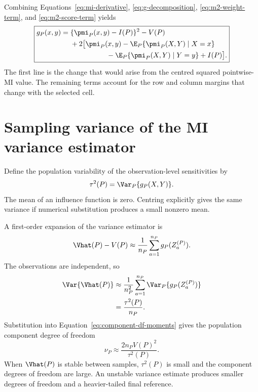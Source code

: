 Combining Equations~\eqref{eq:mi-derivative},
\eqref{eq:g-decomposition}, \eqref{eq:m2-weight-term}, and
\eqref{eq:m2-score-term} yields
\begin{equation}
\boxed{
\begin{aligned}
g_P(x,y)
={}&\{\pmi_P(x,y)-I(P)\}^2-V(P)\\
&+2\bigl[
\pmi_P(x,y)
-\E_P\{\pmi_P(X,Y)\mid X=x\}\\
&\hspace{18mm}
-\E_P\{\pmi_P(X,Y)\mid Y=y\}
+I(P)
\bigr].
\end{aligned}
}
\label{eq:g-final}
\end{equation}
The first line is the change that would arise from the centred squared
pointwise-MI value. The remaining terms account for the row and column margins
that change with the selected cell.

\section{Sampling variance of the MI variance estimator}

Define the population variability of the observation-level sensitivities by
\begin{equation}
  \tau^2(P)=\Var_P\{g_P(X,Y)\}.
  \label{eq:tau-definition}
\end{equation}
The mean of an influence function is zero. Centring explicitly gives the same
variance if numerical substitution produces a small nonzero mean.

A first-order expansion of the variance estimator is
\begin{equation}
  \Vhat(P)-V(P)
  \approx
  \frac{1}{n_P}
  \sum_{a=1}^{n_P}g_P(Z_a^{(P)}).
  \label{eq:vhat-linearization}
\end{equation}
The observations are independent, so
\begin{align}
  \Var\{\Vhat(P)\}
  &\approx
  \frac{1}{n_P^2}
  \sum_{a=1}^{n_P}
  \Var_P\{g_P(Z_a^{(P)})\}\\
  &=\frac{\tau^2(P)}{n_P}.
  \label{eq:vhat-sampling-variance}
\end{align}
Substitution into Equation~\eqref{eq:component-df-moments} gives the
population component degree of freedom
\begin{equation}
  \boxed{
  \nu_P
  \approx
  \frac{2n_PV(P)^2}{\tau^2(P)}
  }.
  \label{eq:population-component-df}
\end{equation}
When \(\Vhat(P)\) is stable between samples, \(\tau^2(P)\) is small and the
component degrees of freedom are large. An unstable variance estimate produces
smaller degrees of freedom and a heavier-tailed final reference.

